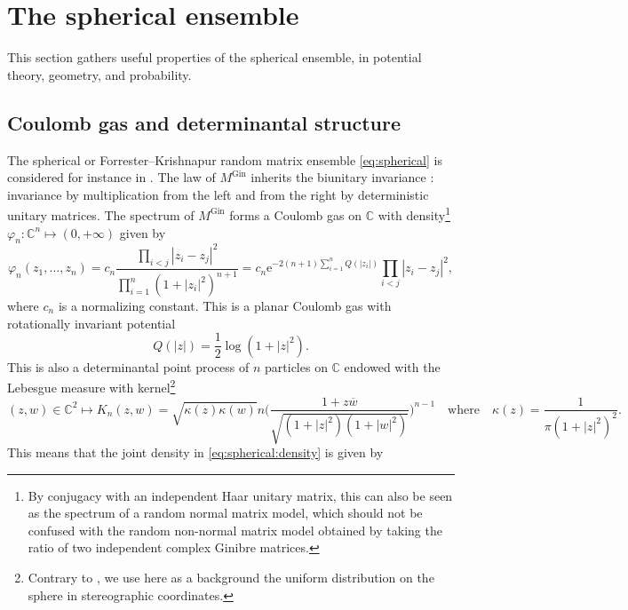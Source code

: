 \documentclass[10pt,reqno]{amsart}
\newcommand{\<}{\langle}
\renewcommand{\>}{\rangle}
\newcommand{\MG}{M^{\mathrm{Gin}}}
\numberwithin{equation}{section}
\begin{document}
%
\section{The spherical ensemble}\label{se:spherical} 
%

This section gathers useful properties of the spherical ensemble, in potential theory, geometry, and probability.

\subsection{Coulomb gas and determinantal structure}

The spherical or Forrester--Krishnapur random matrix ensemble \eqref{eq:spherical} is considered for instance in \cite{MR2552864,MR2641363}. The law of $\MG$ inherits the biunitary invariance : invariance by multiplication from the left and from the right by deterministic unitary matrices. The spectrum of $\MG$ forms a Coulomb gas on $\mathbb{C}$ with density\footnote{By conjugacy with an independent Haar unitary matrix, this can also be seen as the spectrum of a random normal matrix model, which should not be confused with the random non-normal matrix model obtained by taking the ratio of two independent complex Ginibre matrices.} 
$\varphi_n:\mathbb{C}^n\mapsto(0,+\infty)$ given by
\begin{equation}\label{eq:spherical:density}
\varphi_n(z_1,\ldots,z_n)=c_n\frac{\prod_{i<j}|z_i-z_j|^2}{\prod_{i=1}^n(1+|z_i|^2)^{n+1}}
=c_n\mathrm{e}^{-2(n+1)\sum_{i=1}^nQ(|z_i|)}
\prod_{i<j}|z_i-z_j|^2,
\end{equation}
where $c_n$ is a normalizing constant. This is a planar Coulomb gas with rotationally invariant potential 
\begin{equation}
Q(|z|)=\frac{1}{2}\log(1+|z|^2).
\end{equation}
This is also a determinantal point process of $n$ particles on $\mathbb{C}$ 
endowed with the Lebesgue measure with kernel\footnote{Contrary to \cite{MR2552864}, we use here as a background the uniform distribution on the sphere in stereographic coordinates.}
\begin{equation}\label{eq:spherical:kernel}
    (z,w)\in\mathbb{C}^2\mapsto
    K_n(z,w)=\sqrt{\kappa(z)\kappa(w)}
    n\Bigr(\frac{1+z\overline{w}}{\sqrt{(1+|z|^2)(1+|w|^2)}}\Bigr)^{n-1}
    \quad\text{where}\quad
    \kappa(z)=\frac{1}{\pi(1+|z|^2)^2}.
\end{equation}
This means that the joint density in \eqref{eq:spherical:density} is given by
\end{document}
